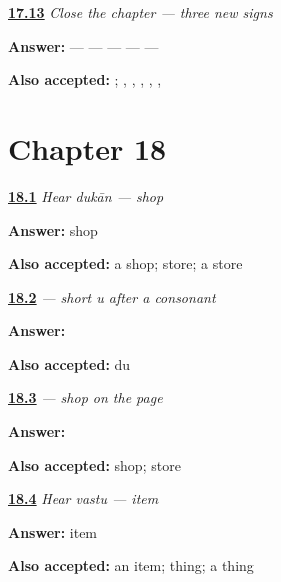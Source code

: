 \noindent\begin{minipage}[t]{\linewidth}
\raggedright
\hyperlink{review-MW-R12-script-close-recall}{\textbf{17.13}} \emph{Close the chapter — three new signs}\par
\small \textbf{Answer:}  —  —  —  —  — \par
\footnotesize \textbf{Also accepted:}      ; , , , , , 
\end{minipage}\par\medskip

\section*{Chapter 18}

\noindent\begin{minipage}[t]{\linewidth}
\raggedright
\hyperlink{review-MW-C13-hear-dukan-meaning}{\textbf{18.1}} \emph{Hear \emph{dukān} — shop}\par
\small \textbf{Answer:} shop\par
\footnotesize \textbf{Also accepted:} a shop; store; a store
\end{minipage}\par\medskip

\noindent\begin{minipage}[t]{\linewidth}
\raggedright
\hyperlink{review-MW-W13-u-matra-write}{\textbf{18.2}} \emph{ — short \emph{u} after a consonant}\par
\small \textbf{Answer:} \par
\footnotesize \textbf{Also accepted:}  du
\end{minipage}\par\medskip

\noindent\begin{minipage}[t]{\linewidth}
\raggedright
\hyperlink{review-MW-C13-dukan-dictation}{\textbf{18.3}} \emph{ — shop on the page}\par
\small \textbf{Answer:} \par
\footnotesize \textbf{Also accepted:}  shop;  store
\end{minipage}\par\medskip

\noindent\begin{minipage}[t]{\linewidth}
\raggedright
\hyperlink{review-MW-C13-hear-vastu-meaning}{\textbf{18.4}} \emph{Hear \emph{vastu} — item}\par
\small \textbf{Answer:} item\par
\footnotesize \textbf{Also accepted:} an item; thing; a thing
\end{minipage}\par\medskip

